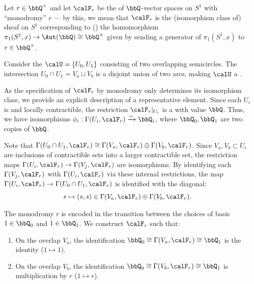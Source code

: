 \begin{example}
    Let $r \in \bbQ^\times$ and let $\calF_r$ be the  of $\bbQ$-vector spaces on $S^1$ with ``monodromy'' $r$ --- by this, we mean that $\calF_r$ is the (isomorphism class of) sheaf on $S^1$ corresponding to () the homomorphism $\pi_1(S^1,x) \to \Aut(\bbQ) \cong \bbQ^\times$ given by sending a generator of $\pi_1(S^1, x)$ to $r \in \bbQ^\times$. 
    
    Consider the  $\calU = \{U_0, U_1\}$ consisting of two overlapping semicircles. The intersection $U_0 \cap U_1 = V_a \sqcup V_b$ is a disjoint union of two  arcs, making $\calU$ a . 

    As the specification of $\calF_r$ by monodromy only determines its isomorphism class, we provide an explicit description of a representative element. Since each $U_i$ is  and locally contractible, the restriction $\calF_r|_{U_i}$ is a  with value $\bbQ$. Thus, we have isomorphisms $\phi_i: \Gamma(U_i, \calF_r) \xrightarrow{\sim} \bbQ_i$, where $\bbQ_0, \bbQ_1$ are two copies of $\bbQ$.

    Note that $\Gamma(U_0 \cap U_1, \calF_r) \cong \Gamma(V_a, \calF_r) \oplus \Gamma(V_b, \calF_r)$. Since $V_a, V_b \subset U_i$ are inclusions of contractible sets into a larger contractible set, the restriction maps $\Gamma(U_i, \calF_r) \to \Gamma(V_j, \calF_r)$ are isomorphisms. By identifying each $\Gamma(V_j, \calF_r)$ with $\Gamma(U_i, \calF_r)$ via these internal restrictions, the map $\Gamma(U_i, \calF_r) \to \Gamma(U_0 \cap U_1, \calF_r)$ is identified with the diagonal:
    $$s \mapsto (s, s) \in \Gamma(V_a, \calF_r) \oplus \Gamma(V_b, \calF_r).$$

    The monodromy $r$ is encoded in the transition between the choices of basis $1 \in \bbQ_0$ and $1 \in \bbQ_1$. We construct $\calF_r$ such that:
    \begin{enumerate}
        \item On the overlap $V_a$, the identification $\bbQ_0 \cong \Gamma(V_a, \calF_r) \cong \bbQ_1$ is the identity ($1 \mapsto 1$).
        \item On the overlap $V_b$, the identification $\bbQ_0 \cong \Gamma(V_b, \calF_r) \cong \bbQ_1$ is multiplication by $r$ ($1 \mapsto r$).
    \end{enumerate}


\end{example}
